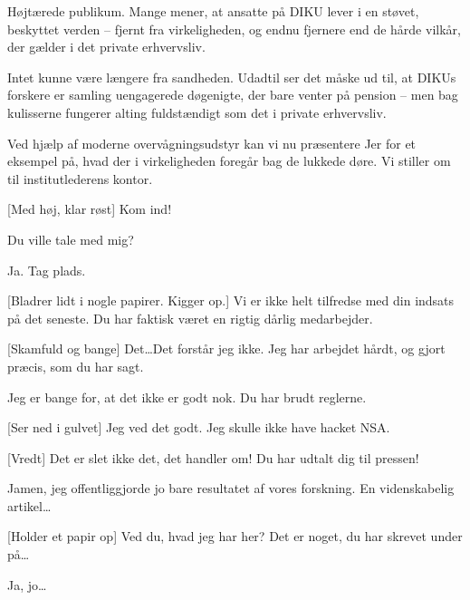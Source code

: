 \documentclass[a4paper,11pt]{article}
\begin{document}
  
\begin{sketch}


 Højtærede publikum. Mange mener, at ansatte på DIKU lever i en
støvet, beskyttet verden -- fjernt fra virkeligheden, og endnu fjernere end de
hårde vilkår, der gælder i det private erhvervsliv.

Intet kunne være længere fra sandheden. Udadtil ser det måske ud til, at DIKUs
forskere er samling uengagerede døgenigte, der bare venter på pension -- men
bag kulisserne fungerer alting fuldstændigt som det i 
private erhvervsliv.

Ved hjælp af moderne overvågningsudstyr kan vi nu præsentere Jer for et
eksempel på, hvad der i virkeligheden foregår bag de lukkede døre. Vi stiller
om til institutlederens kontor.


[Med høj, klar røst] Kom ind!


 Du ville tale med mig?

 Ja. Tag plads.


[Bladrer lidt i nogle papirer. Kigger op.] Vi er ikke helt tilfredse
med din indsats på det seneste. Du har faktisk været en rigtig dårlig
medarbejder.

[Skamfuld og bange] Det\ldots   Det forstår jeg ikke. Jeg har arbejdet
hårdt, og gjort præcis, som du har sagt.

 Jeg er bange for, at det ikke er godt nok. Du har brudt reglerne.

[Ser ned i gulvet] Jeg ved det godt. Jeg skulle ikke have hacket NSA.

[Vredt] Det er slet ikke det, det handler om!  Du har udtalt dig til pressen!

 Jamen, jeg offentliggjorde jo bare resultatet af vores forskning. En
videnskabelig artikel\ldots


[Holder et papir op] Ved du, hvad jeg har her? Det er noget, du har
skrevet under på\ldots

 Ja, jo\ldots


\end{sketch}
\end{document}
